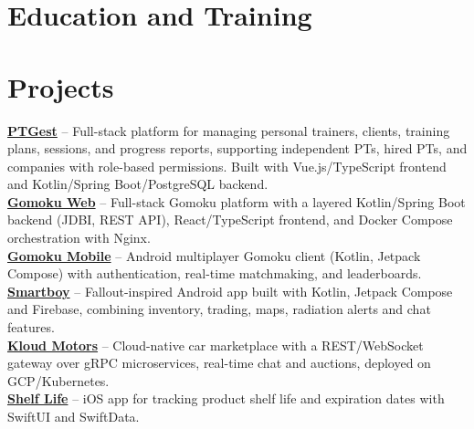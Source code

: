 \documentclass[11pt,a4paper]{moderncv}
\begin{document}
\section{Education and Training}

\section{Projects}
\textbf{\href{https://github.com/PTGest/ptgest}{PTGest}} -- Full-stack platform for managing personal trainers, clients, training plans, sessions, and progress reports, supporting independent PTs, hired PTs, and companies with role-based permissions. Built with Vue.js/TypeScript frontend and Kotlin/Spring Boot/PostgreSQL backend. \\[6pt]
\textbf{\href{https://github.com/DanielSousa01/gomoku-web}{Gomoku Web}} -- Full-stack Gomoku platform with a layered Kotlin/Spring Boot backend (JDBI, REST API), React/TypeScript frontend, and Docker Compose orchestration with Nginx. \\[6pt]
\textbf{\href{https://github.com/DanielSousa01/gomoku-mobile}{Gomoku Mobile}} -- Android multiplayer Gomoku client (Kotlin, Jetpack Compose) with authentication, real-time matchmaking, and leaderboards. \\[6pt]
\textbf{\href{https://github.com/DanielSousa01/smartboy}{Smartboy}} -- Fallout-inspired Android app built with Kotlin, Jetpack Compose and Firebase, combining inventory, trading, maps, radiation alerts and chat features. \\[6pt]
\textbf{\href{https://github.com/DanielSousa01/kloud-motors}{Kloud Motors}} -- Cloud-native car marketplace with a REST/WebSocket gateway over gRPC microservices, real-time chat and auctions, deployed on GCP/Kubernetes. \\[6pt]
\textbf{\href{https://github.com/DanielSousa01/shelf-life}{Shelf Life}} -- iOS app for tracking product shelf life and expiration dates with SwiftUI and SwiftData.
\end{document}
